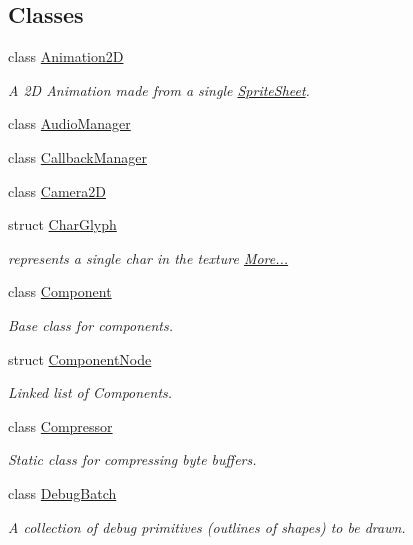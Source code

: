 \subsection*{Classes}
\begin{DoxyCompactItemize}
\item 
class \hyperlink{classnta_1_1Animation2D}{Animation2D}
\begin{DoxyCompactList}\small\item\em A 2D Animation made from a single \hyperlink{structnta_1_1SpriteSheet}{Sprite\+Sheet}. \end{DoxyCompactList}\item 
class \hyperlink{classnta_1_1AudioManager}{Audio\+Manager}
\item 
class \hyperlink{classnta_1_1CallbackManager}{Callback\+Manager}
\item 
class \hyperlink{classnta_1_1Camera2D}{Camera2D}
\item 
struct \hyperlink{namespacenta_d4/d26/structnta_1_1CharGlyph}{Char\+Glyph}
\begin{DoxyCompactList}\small\item\em represents a single char in the texture  \hyperlink{namespacenta_d4/d26/structnta_1_1CharGlyph}{More...}\end{DoxyCompactList}\item 
class \hyperlink{classnta_1_1Component}{Component}
\begin{DoxyCompactList}\small\item\em Base class for components. \end{DoxyCompactList}\item 
struct \hyperlink{structnta_1_1ComponentNode}{Component\+Node}
\begin{DoxyCompactList}\small\item\em Linked list of Components. \end{DoxyCompactList}\item 
class \hyperlink{classnta_1_1Compressor}{Compressor}
\begin{DoxyCompactList}\small\item\em Static class for compressing byte buffers. \end{DoxyCompactList}\item 
class \hyperlink{classnta_1_1DebugBatch}{Debug\+Batch}
\begin{DoxyCompactList}\small\item\em A collection of debug primitives (outlines of shapes) to be drawn. \end{DoxyCompactList}\item 

\end{DoxyCompactItemize}
